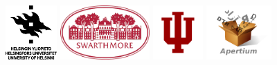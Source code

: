 \documentclass[a0paper,fleqn]{betterposter}
\begin{document}
{\includegraphics[height=5.65em]{img/logo-helsinki}
\includegraphics[height=5.65em]{img/logo-swarthmore}
\includegraphics[height=5.65em]{img/logo-iu}
\includegraphics[height=5.65em]{img/logo-apertium}

}
\end{document}
